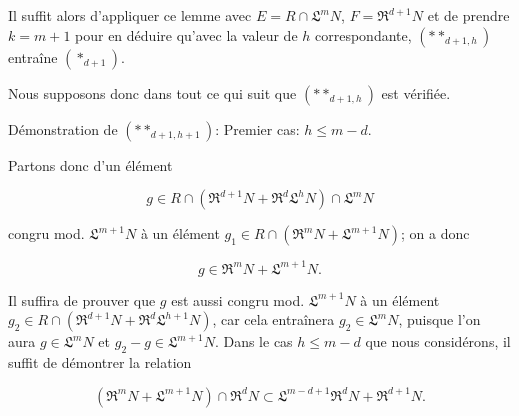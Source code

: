 Il suffit alors d'appliquer ce lemme avec $E=R\cap\mathfrak L^mN$, $F=\mathfrak R^{d+1}N$ et de prendre $k=m+1$ pour en déduire qu'avec la valeur de $h$ correspondante, $(**_{d+1,h})$ entraîne $(*_{d+1})$.

Nous supposons donc dans tout ce qui suit que $(**_{d+1,h})$ est vérifiée.

\begin{env}[19.7.1.8]
\label{IV.19.7.1.8}
Démonstration de $(**_{d+1,h+1})$: Premier cas: $h\leq m-d$.
\end{env}

Partons donc d'un élément
\begin{env}[19.7.1.9]
\label{IV.19.7.1.9}
\[
  g\in R\cap(\mathfrak R^{d+1}N+\mathfrak R^d\mathfrak L^hN)\cap\mathfrak L^mN
\]
\end{env}
congru mod. $\mathfrak L^{m+1}N$ à un élément $g_1\in R\cap(\mathfrak R^mN+\mathfrak L^{m+1}N)$; on a donc
\begin{env}[19.7.1.10]
\label{IV.19.7.1.10}
\[
  g\in\mathfrak R^mN+\mathfrak L^{m+1}N.
\]
\end{env}

Il suffira de prouver que $g$ est aussi congru mod. $\mathfrak L^{m+1}N$ à un élément $g_2\in R\cap(\mathfrak R^{d+1}N+\mathfrak R^d\mathfrak L^{h+1}N)$, car cela entraînera $g_2\in\mathfrak L^mN$, puisque l'on aura $g\in\mathfrak L^mN$ et $g_2-g\in\mathfrak L^{m+1}N$. Dans le cas $h\leq m-d$ que nous considérons, il suffit de démontrer la relation
\begin{env}[19.7.1.11]
\label{IV.19.7.1.11}
\[
  (\mathfrak R^mN+\mathfrak L^{m+1}N)\cap\mathfrak R^dN\subset\mathfrak L^{m-d+1}\mathfrak R^dN+\mathfrak R^{d+1}N.
\]
\end{env}

